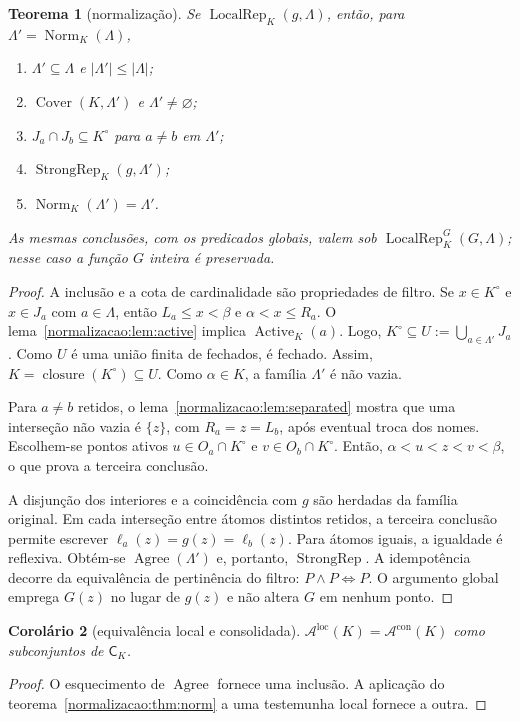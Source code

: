 \documentclass[12pt,a4paper]{article}
\theoremstyle{preciso}
\newtheorem{teorema}{Teorema}[section]
\newtheorem{corolario}[teorema]{Corolário}
\theoremstyle{definition}
\newcommand{\CK}{\mathsf C_K}
\newcommand{\Norm}{\operatorname{Norm}}
\newcommand{\Act}{\operatorname{Active}}
\newcommand{\Cov}{\operatorname{Cover}}
\newcommand{\Agree}{\operatorname{Agree}}
\newcommand{\Loc}{\operatorname{LocalRep}}
\newcommand{\Str}{\operatorname{StrongRep}}
\newcommand{\Aloc}{\mathcal A^{\mathrm{loc}}}
\newcommand{\Astr}{\mathcal A^{\mathrm{con}}}
\newcommand{\cls}{\operatorname{closure}}
\theoremstyle{preciso}
\theoremstyle{preciso}
\theoremstyle{preciso}
\theoremstyle{preciso}
\theoremstyle{definition}
\theoremstyle{preciso}
\theoremstyle{definition}
\theoremstyle{preciso}
\theoremstyle{preciso}
\theoremstyle{definition}
\begin{document}
\begin{teorema}[normalização]\label{map:normalizacao:3.5}\label{normalizacao:thm:norm}
Se $\Loc_K(g,\Lambda)$, então, para $\Lambda'=\Norm_K(\Lambda)$,
\begin{enumerate}
\item $\Lambda'\subseteq\Lambda$ e $|\Lambda'|\le|\Lambda|$;
\item $\Cov(K,\Lambda')$ e $\Lambda'\ne\varnothing$;
\item $J_a\cap J_b\subseteq K^\circ$ para $a\ne b$ em $\Lambda'$;
\item $\Str_K(g,\Lambda')$;
\item $\Norm_K(\Lambda')=\Lambda'$.
\end{enumerate}
As mesmas conclusões, com os predicados globais, valem sob
$\Loc^G_K(G,\Lambda)$; nesse caso a função $G$ inteira é preservada.
\end{teorema}
\begin{proof}
A inclusão e a cota de cardinalidade são propriedades de filtro.
Se $x\in K^\circ$ e $x\in J_a$ com $a\in\Lambda$, então
$L_a\le x<\beta$ e $\alpha<x\le R_a$. O
lema~\ref{normalizacao:lem:active} implica $\Act_K(a)$. Logo,
$K^\circ\subseteq U:=\bigcup_{a\in\Lambda'}J_a$.
Como $U$ é uma união finita de fechados, é fechado.
Assim, $K=\cls(K^\circ)\subseteq U$. Como $\alpha\in K$,
a família $\Lambda'$ é não vazia.

Para $a\ne b$ retidos, o lema~\ref{normalizacao:lem:separated} mostra que
uma interseção não vazia é $\{z\}$, com
$R_a=z=L_b$, após eventual troca dos nomes. Escolhem-se pontos ativos
$u\in O_a\cap K^\circ$ e $v\in O_b\cap K^\circ$. Então,
$\alpha<u<z<v<\beta$, o que prova a terceira conclusão.

A disjunção dos interiores e a coincidência com $g$ são herdadas da
família original. Em cada interseção entre átomos distintos retidos,
a terceira conclusão permite escrever
$\ell_a(z)=g(z)=\ell_b(z)$. Para átomos iguais, a igualdade é
reflexiva. Obtém-se $\Agree(\Lambda')$ e, portanto, $\Str$.
A idempotência decorre da equivalência de pertinência do filtro:
$P\land P\Longleftrightarrow P$. O argumento global emprega
$G(z)$ no lugar de $g(z)$ e não altera $G$ em nenhum ponto.
\end{proof}

\begin{corolario}[equivalência local e consolidada]\label{map:normalizacao:3.6}\label{normalizacao:cor:classes}
$\Aloc(K)=\Astr(K)$ como subconjuntos de $\CK$.
\end{corolario}
\begin{proof}
O esquecimento de $\Agree$ fornece uma inclusão. A aplicação do
teorema~\ref{normalizacao:thm:norm} a uma testemunha local fornece a outra.
\end{proof}
\end{document}
